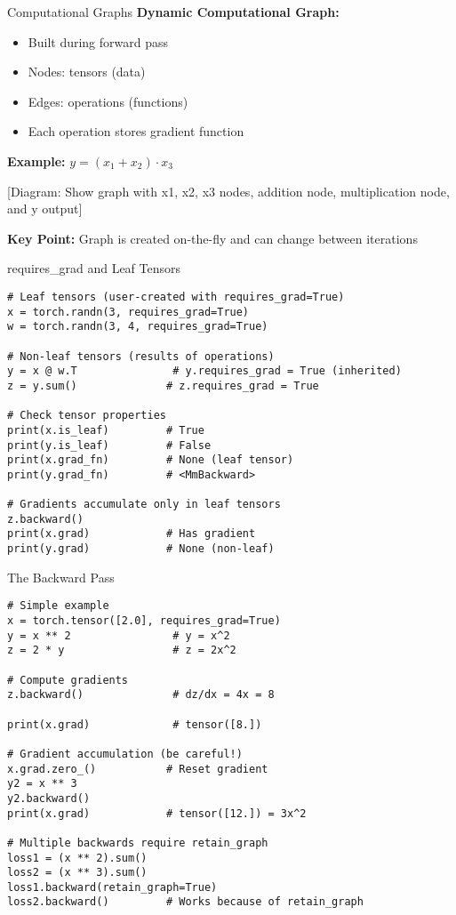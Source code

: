 \documentclass[aspectratio=169,10pt]{beamer}
\begin{document}
\begin{frame}{Computational Graphs}
\textbf{Dynamic Computational Graph:}
\begin{itemize}
    \item Built during forward pass
    \item Nodes: tensors (data)
    \item Edges: operations (functions)
    \item Each operation stores gradient function
\end{itemize}

\textbf{Example:} $y = (x_1 + x_2) \cdot x_3$
\begin{center}
[Diagram: Show graph with x1, x2, x3 nodes, addition node, multiplication node, and y output]
\end{center}

\textbf{Key Point:} Graph is created on-the-fly and can change between iterations
\end{frame}

\begin{frame}[fragile]{requires\_grad and Leaf Tensors}
\begin{lstlisting}
# Leaf tensors (user-created with requires_grad=True)
x = torch.randn(3, requires_grad=True)
w = torch.randn(3, 4, requires_grad=True)

# Non-leaf tensors (results of operations)
y = x @ w.T               # y.requires_grad = True (inherited)
z = y.sum()              # z.requires_grad = True

# Check tensor properties
print(x.is_leaf)         # True
print(y.is_leaf)         # False
print(x.grad_fn)         # None (leaf tensor)
print(y.grad_fn)         # <MmBackward>

# Gradients accumulate only in leaf tensors
z.backward()
print(x.grad)            # Has gradient
print(y.grad)            # None (non-leaf)
\end{lstlisting}
\end{frame}

\begin{frame}[fragile]{The Backward Pass}
\begin{lstlisting}
# Simple example
x = torch.tensor([2.0], requires_grad=True)
y = x ** 2                # y = x^2
z = 2 * y                 # z = 2x^2

# Compute gradients
z.backward()              # dz/dx = 4x = 8

print(x.grad)             # tensor([8.])

# Gradient accumulation (be careful!)
x.grad.zero_()           # Reset gradient
y2 = x ** 3
y2.backward()
print(x.grad)            # tensor([12.]) = 3x^2

# Multiple backwards require retain_graph
loss1 = (x ** 2).sum()
loss2 = (x ** 3).sum()
loss1.backward(retain_graph=True)
loss2.backward()         # Works because of retain_graph
\end{lstlisting}
\end{frame}
\end{document}
